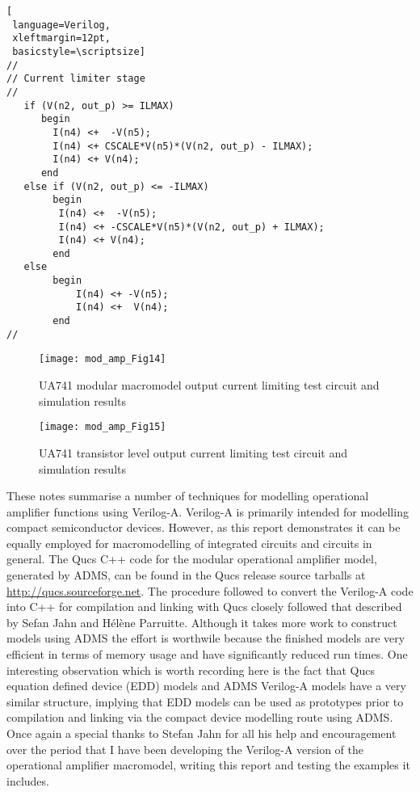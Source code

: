 \begin{lstlisting}[
 language=Verilog, 
 xleftmargin=12pt,
 basicstyle=\scriptsize]
//
// Current limiter stage
//
   if (V(n2, out_p) >= ILMAX) 
      begin
        I(n4) <+  -V(n5);
        I(n4) <+ CSCALE*V(n5)*(V(n2, out_p) - ILMAX);
        I(n4) <+ V(n4);
      end
   else if (V(n2, out_p) <= -ILMAX)
        begin
         I(n4) <+  -V(n5);
         I(n4) <+ -CSCALE*V(n5)*(V(n2, out_p) + ILMAX);
         I(n4) <+ V(n4);
        end
   else
        begin
            I(n4) <+ -V(n5);
            I(n4) <+  V(n4);
        end
//
\end{lstlisting}

\begin{figure} [h]
  \centering
  \texttt{[image: mod\_amp\_Fig14]}
  \caption{UA741 modular macromodel output current limiting test circuit and simulation results}
  \label{fig:mod_amp14}
\end{figure} 


\begin{figure} [h]
  \centering
  \texttt{[image: mod\_amp\_Fig15]}
  \caption{UA741 transistor level output current limiting test circuit and simulation results}
  \label{fig:mod_amp15}
\end{figure} 



These notes summarise a number of techniques for modelling operational
amplifier functions using Verilog-A.  Verilog-A is primarily intended
for modelling compact semiconductor devices.  However, as this report
demonstrates it can be equally employed for macromodelling of
integrated circuits and circuits in general. The Qucs C++ code for the
modular operational amplifier model, generated by ADMS, can be found
in the Qucs release source tarballs at
\url{http://qucs.sourceforge.net}.  The procedure followed to convert
the Verilog-A code into C++ for compilation and linking with Qucs
closely followed that described by Sefan Jahn and H\'{e}l\`{e}ne
Parruitte.  Although it takes more work to construct models using ADMS
the effort is worthwile because the finished models are very efficient
in terms of memory usage and have significantly reduced run times. One
interesting observation which is worth recording here is the fact that
Qucs equation defined device (EDD) models and ADMS Verilog-A models
have a very similar structure, implying that EDD models can be used as
prototypes prior to compilation and linking via the compact device
modelling route using ADMS. Once again a special thanks to Stefan Jahn
for all his help and encouragement over the period that I have been
developing the Verilog-A version of the operational amplifier
macromodel, writing this report and testing the examples it includes.
